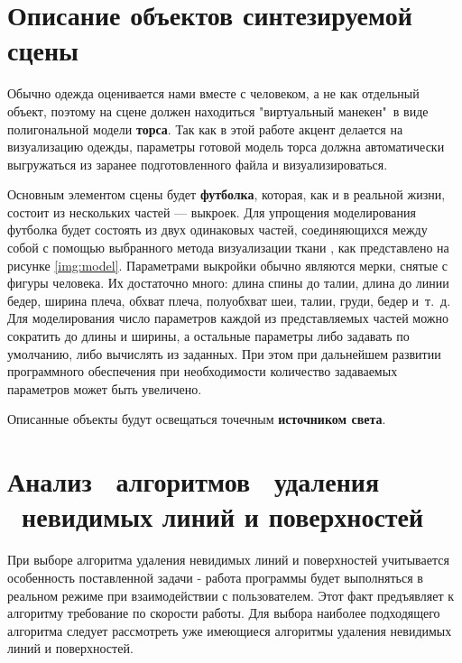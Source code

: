 \section{Описание объектов синтезируемой сцены}

Обычно одежда оценивается нами вместе с человеком, а не как отдельный объект,
поэтому на сцене должен находиться "виртуальный манекен"\ в виде полигональной
модели \textbf{торса}. Так как в этой работе акцент делается на визуализацию
одежды, параметры готовой модель торса должна автоматически выгружаться из
заранее подготовленного файла и визуализироваться.

Основным элементом сцены будет \textbf{футболка}, которая, как и в реальной
жизни, состоит из нескольких частей --- выкроек. Для упрощения моделирования
футболка будет состоять из двух одинаковых частей, соединяющихся между собой с
помощью выбранного метода визуализации ткани \cite{bib01}, как представлено на
рисунке \ref{img:model}. Параметрами выкройки обычно являются мерки, снятые с
фигуры человека. Их достаточно много: длина спины до талии, длина до линии
бедер, ширина плеча, обхват плеча, полуобхват шеи, талии, груди, бедер и~т.~д.
Для моделирования число параметров каждой из представляемых частей можно
сократить до длины и ширины, а остальные параметры либо задавать по умолчанию,
либо вычислять из заданных. При этом при дальнейшем развитии программного
обеспечения при необходимости количество задаваемых параметров может быть
увеличено.


Описанные объекты будут освещаться точечным \textbf{источником света}.



\section{Анализ ~алгоритмов ~удаления ~невидимых линий и поверхностей}

При выборе алгоритма удаления невидимых линий и поверхностей учитывается
особенность поставленной задачи - работа программы будет выполняться в реальном
режиме при взаимодействии с пользователем. Этот факт предъявляет к алгоритму
требование по скорости работы. Для выбора наиболее подходящего алгоритма
следует рассмотреть уже имеющиеся алгоритмы удаления невидимых линий и
поверхностей.

